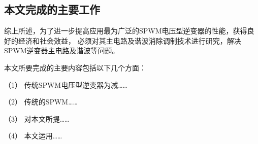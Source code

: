     \subsection{本文完成的主要工作}%

    综上所述，为了进一步提高应用最为广泛的SPWM电压型逆变器的性能，获得良好的经济和社会效益，
    必须对其主电路及谐波消除调制技术进行研究，解决SPWM逆变器主电路及谐波等问题。

    本文所要完成的主要内容包括以下几个方面：

    （1）	\quad \space 传统SPWM电压型逆变器为减……

    （2）	\quad \space 传统的SPWM……

    （3）	\quad \space 对本文所提……

    （4）	\quad \space 本文运用……



    








    \clearpage
